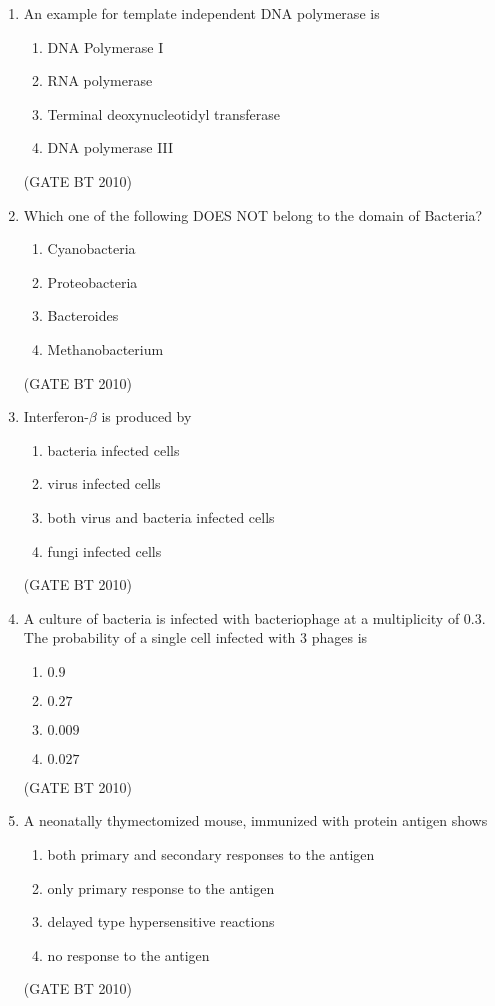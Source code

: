 \documentclass[journal,12pt,onecolumn]{IEEEtran}
\theoremstyle{remark}
\begin{document}
\begin{enumerate}
\item An example for template independent DNA polymerase is  
\begin{enumerate}
    \item DNA Polymerase I  
    \item RNA polymerase  
    \item Terminal deoxynucleotidyl transferase  
    \item DNA polymerase III  
\end{enumerate}
\hfill (GATE BT 2010)

\item Which one of the following DOES NOT belong to the domain of Bacteria?  
\begin{enumerate}
    \item Cyanobacteria  
    \item Proteobacteria  
    \item Bacteroides  
    \item Methanobacterium  
\end{enumerate}
\hfill (GATE BT 2010)

\item Interferon-$\beta$ is produced by  
\begin{enumerate}
    \item bacteria infected cells  
    \item virus infected cells  
    \item both virus and bacteria infected cells  
    \item fungi infected cells  
\end{enumerate}
\hfill (GATE BT 2010)

\item A culture of bacteria is infected with bacteriophage at a multiplicity of $0.3$.  
The probability of a single cell infected with $3$ phages is  
\begin{enumerate}
    \item $0.9$  
    \item $0.27$  
    \item $0.009$  
    \item $0.027$  
\end{enumerate}
\hfill (GATE BT 2010)

\item A neonatally thymectomized mouse, immunized with protein antigen shows  
\begin{enumerate}
    \item both primary and secondary responses to the antigen  
    \item only primary response to the antigen  
    \item delayed type hypersensitive reactions  
    \item no response to the antigen  
\end{enumerate}
\hfill (GATE BT 2010)


\end{enumerate}
\end{document}
